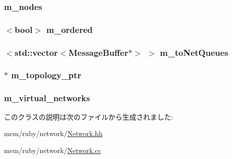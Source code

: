 \label{classNetwork_a5d6a051ce5268f65e8e97c963457fdad}
\hypertarget{classNetwork_aeaedba88d543aaa41c0d3a4a2dda8777}{
\subsubsection[{m\_\-nodes}]{ {\bf m\_\-nodes}}}
\label{classNetwork_aeaedba88d543aaa41c0d3a4a2dda8777}
\hypertarget{classNetwork_a637cb185f1a2c19da05ac9e2b768129d}{
\subsubsection[{m\_\-ordered}]{$<$bool$>$ {\bf m\_\-ordered}}}
\label{classNetwork_a637cb185f1a2c19da05ac9e2b768129d}
\hypertarget{classNetwork_ab3540c54c69c669544c78f25ce6f0b55}{
\subsubsection[{m\_\-toNetQueues}]{$<${\bf std::vector}$<${\bf MessageBuffer}$\ast$$>$ $>$ {\bf m\_\-toNetQueues}}}
\label{classNetwork_ab3540c54c69c669544c78f25ce6f0b55}
\hypertarget{classNetwork_ab71cd6d4ac5c9ca1d70904dd6d633dbc}{
\subsubsection[{m\_\-topology\_\-ptr}]{$\ast$ {\bf m\_\-topology\_\-ptr}}}
\label{classNetwork_ab71cd6d4ac5c9ca1d70904dd6d633dbc}
\hypertarget{classNetwork_a3c1d97c5d987e52985843dcb76edc7fb}{
\subsubsection[{m\_\-virtual\_\-networks}]{ {\bf m\_\-virtual\_\-networks}}}
\label{classNetwork_a3c1d97c5d987e52985843dcb76edc7fb}


このクラスの説明は次のファイルから生成されました:\begin{DoxyCompactItemize}
\item 
mem/ruby/network/\hyperlink{Network_8hh}{Network.hh}\item 
mem/ruby/network/\hyperlink{Network_8cc}{Network.cc}\end{DoxyCompactItemize}
